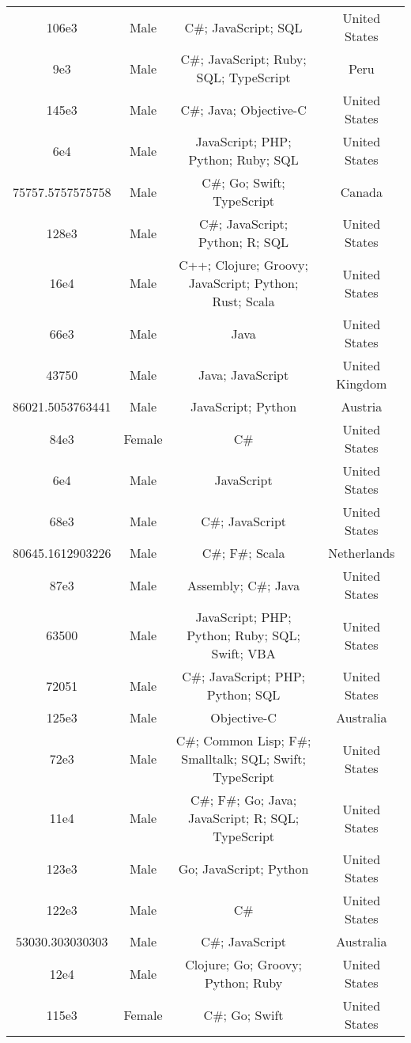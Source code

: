 \begin{center}
\begin{tabular}{ |c|c|c|c| }
106e3  &  Male  &  C\#; JavaScript; SQL  &  United States  \\ 
9e3  &  Male  &  C\#; JavaScript; Ruby; SQL; TypeScript  &  Peru  \\ 
145e3  &  Male  &  C\#; Java; Objective-C  &  United States  \\ 
6e4  &  Male  &  JavaScript; PHP; Python; Ruby; SQL  &  United States  \\ 
75757.5757575758  &  Male  &  C\#; Go; Swift; TypeScript  &  Canada  \\ 
128e3  &  Male  &  C\#; JavaScript; Python; R; SQL  &  United States  \\ 
16e4  &  Male  &  C++; Clojure; Groovy; JavaScript; Python; Rust; Scala  &  United States  \\ 
66e3  &  Male  &  Java  &  United States  \\ 
43750  &  Male  &  Java; JavaScript  &  United Kingdom  \\ 
86021.5053763441  &  Male  &  JavaScript; Python  &  Austria  \\ 
84e3  &  Female  &  C\#  &  United States  \\ 
6e4  &  Male  &  JavaScript  &  United States  \\ 
68e3  &  Male  &  C\#; JavaScript  &  United States  \\ 
80645.1612903226  &  Male  &  C\#; F\#; Scala  &  Netherlands  \\ 
87e3  &  Male  &  Assembly; C\#; Java  &  United States  \\ 
63500  &  Male  &  JavaScript; PHP; Python; Ruby; SQL; Swift; VBA  &  United States  \\ 
72051  &  Male  &  C\#; JavaScript; PHP; Python; SQL  &  United States  \\ 
125e3  &  Male  &  Objective-C  &  Australia  \\ 
72e3  &  Male  &  C\#; Common Lisp; F\#; Smalltalk; SQL; Swift; TypeScript  &  United States  \\ 
11e4  &  Male  &  C\#; F\#; Go; Java; JavaScript; R; SQL; TypeScript  &  United States  \\ 
123e3  &  Male  &  Go; JavaScript; Python  &  United States  \\ 
122e3  &  Male  &  C\#  &  United States  \\ 
53030.303030303  &  Male  &  C\#; JavaScript  &  Australia  \\ 
12e4  &  Male  &  Clojure; Go; Groovy; Python; Ruby  &  United States  \\ 
115e3  &  Female  &  C\#; Go; Swift  &  United States  \\ 

\end{tabular}
\end{center}
